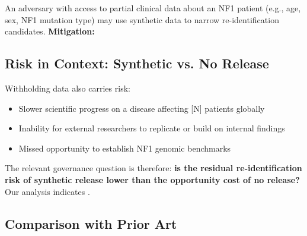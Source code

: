 \documentclass[webpdf,contemporary,large]{oup-authoring-template}%
\theoremstyle{thmstyleone}%
\theoremstyle{thmstyletwo}%
\theoremstyle{thmstylethree}%
\begin{document}
\begin{riskbox}[title={Auxiliary information attacks}]
  An adversary with access to partial clinical data about an NF1 patient
  (e.g., age, sex, NF1 mutation type) may use synthetic data
  to narrow re-identification candidates.
  \textbf{Mitigation:} 
\end{riskbox}



\subsection{Risk in Context: Synthetic vs. No Release}

Withholding data also carries risk:
\begin{itemize}
  \item Slower scientific progress on a disease affecting [N] patients
        globally
  \item Inability for external researchers to replicate or build on
        internal findings
  \item Missed opportunity to establish NF1 genomic benchmarks
\end{itemize}

The relevant governance question is therefore:
\textbf{is the residual re-identification risk of synthetic release lower
than the opportunity cost of no release?}
Our analysis indicates .

\subsection{Comparison with Prior Art}



\end{document}
